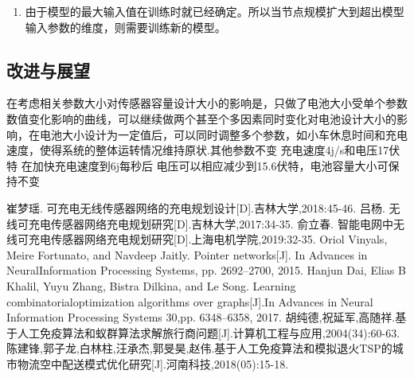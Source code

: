 \documentclass{whutmod}
\newcommand{\upcite}[1]{\textsuperscript{\textsuperscript{\cite{#1}}}}
\begin{document}
\begin{enumerate}
	\item 由于模型的最大输入值在训练时就已经确定。所以当节点规模扩大到超出模型输入参数的维度，则需要训练新的模型。
\end{enumerate}


\subsection{改进与展望}
在考虑相关参数大小对传感器容量设计大小的影响是，只做了电池大小受单个参数数值变化影响的曲线，可以继续做两个甚至个多因素同时变化对电池设计大小的影响，在电池大小设计为一定值后，可以同时调整多个参数，如小车休息时间和充电速度，使得系统的整体运转情况维持原状.其他参数不变   充电速度4j/s和电压17伏特 在加快充电速度到6j每秒后 电压可以相应减少到15.6伏特，电池容量大小可保持不变

\appendix %
\begin{thebibliography}{9}%
	崔梦瑶. 可充电无线传感器网络的充电规划设计[D].吉林大学,2018:45-46.
	吕杨. 无线可充电传感器网络充电规划研究[D].吉林大学,2017:34-35.
	俞立春. 智能电网中无线可充电传感器网络充电规划研究[D].上海电机学院,2019:32-35.
     Oriol Vinyals, Meire Fortunato, and Navdeep Jaitly. Pointer networks[J]. In Advances in NeuralInformation Processing Systems, pp. 2692–2700, 2015.
     Hanjun Dai, Elias B Khalil, Yuyu Zhang, Bistra Dilkina, and Le Song. Learning combinatorialoptimization algorithms over graphs[J].In Advances in Neural Information Processing Systems 30,pp. 6348–6358, 2017.
     胡纯德,祝延军,高随祥.基于人工免疫算法和蚁群算法求解旅行商问题[J].计算机工程与应用,2004(34):60-63.
     陈建锋,郭子龙,白林柱,汪承杰,郭旻昊,赵伟.基于人工免疫算法和模拟退火TSP的城市物流空中配送模式优化研究[J].河南科技,2018(05):15-18.


     
\end{thebibliography}
\newpage
\end{document}
